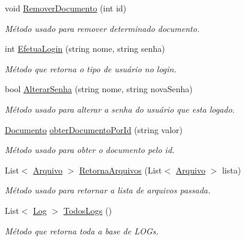 \begin{DoxyCompactItemize}
void \hyperlink{class_sistema_r_h_1_1_adaptador_afe3ebb2caaf8ac7eb1a79d40e3162f06}{RemoverDocumento} (int id)
\begin{DoxyCompactList}\small\item\em Método usado para remover determinado documento. \item\end{DoxyCompactList}\item 
int \hyperlink{class_sistema_r_h_1_1_adaptador_acac5ac58cd1612687346492460481ed3}{EfetuaLogin} (string nome, string senha)
\begin{DoxyCompactList}\small\item\em Método que retorna o tipo de usuário no login. \item\end{DoxyCompactList}\item 
bool \hyperlink{class_sistema_r_h_1_1_adaptador_a93d96f4aa60c7f6d31969b9cc30ba709}{AlterarSenha} (string nome, string novaSenha)
\begin{DoxyCompactList}\small\item\em Método usado para alterar a senha do usuário que esta logado. \item\end{DoxyCompactList}\item 
\hyperlink{class_sistema_r_h_1_1_documento}{Documento} \hyperlink{class_sistema_r_h_1_1_adaptador_a85a25e43f49a791019e88745c7d2eb4d}{obterDocumentoPorId} (string valor)
\begin{DoxyCompactList}\small\item\em Método usado para obter o documento pelo id. \item\end{DoxyCompactList}\item 
List$<$ \hyperlink{class_sistema_r_h_1_1_arquivo}{Arquivo} $>$ \hyperlink{class_sistema_r_h_1_1_adaptador_a52212aafd317a1a50ab530e9cdd27fd2}{RetornaArquivos} (List$<$ \hyperlink{class_sistema_r_h_1_1_arquivo}{Arquivo} $>$ lista)
\begin{DoxyCompactList}\small\item\em Método usado para retornar a lista de arquivos passada. \item\end{DoxyCompactList}\item 
List$<$ \hyperlink{class_sistema_r_h_1_1_log}{Log} $>$ \hyperlink{class_sistema_r_h_1_1_adaptador_a244664338b5f1c620b2f26c9ff5e48a5}{TodosLogs} ()
\begin{DoxyCompactList}\small\item\em Método que retorna toda a base de LOGs. \item\end{DoxyCompactList}\item 

\end{DoxyCompactItemize}
